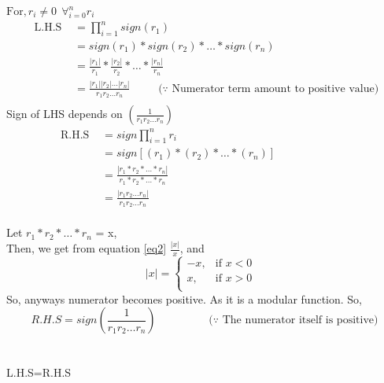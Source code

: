 \documentclass{article}
\begin{document}
$ \text{For,} \, r_i \ne 0  \;\, \forall_{i=0}^n r_i $
\begin{equation} \label{eq3}
\begin{split}
\text{ L.H.S } & =  \prod_{i=1 }^n sign(r_1)  \\
& = sign(r_1)*sign(r_2)*\dots *sign(r_n)  \\
& = \frac{|r_1|}{r_1}*\frac{|r_2|}{r_2}*\dots * \frac{|r_n|}{r_n}\\
& = \frac{|r_1||r_2|...|r_n|}{r_1r_2...r_n}\, \hspace{1cm}
\text{($\because$ Numerator term amount to positive value)}\\ %
\end{split}
\end{equation}
Sign of LHS depends on $(\frac{1}{r_1r_2...r_n})$
\\
\begin{equation} \label{eq4}
\begin{split}
\text{ R.H.S } & =  sign \prod_{i=1}^n r_i \\
& = sign[(r_1)*(r_2)*\dots *(r_n)]  \\
& = \frac{|r_1*r_2* \dots *r_n|}{r_1*r_2* \dots *r_n} \hspace{7cm}\\
& = \frac{|r_1r_2\dots r_n|}{r_1r_2...r_n}  \\
\end{split}
\end{equation}

Let $r_1*r_2* \dots *r_n $ = x,\\
Then, we get from equation \ref{eq2}  $\frac{|x|}{x}$, and \\
$$
|x|=\begin{cases}
			-x, & \text{if $x<0$ }\\
            x, & \text{if $x>0$}\\
		 \end{cases}
$$
So, anyways numerator becomes positive. As it is a modular function. So, \\
\[R.H.S =  sign(\frac{1}{r_1r_2 \dots r_n}) \hspace{2cm} \text{($\because$ The numerator itself is positive)} \]\\\\
\hspace*{6cm}  L.H.S=R.H.S\\ 
\end{document}
